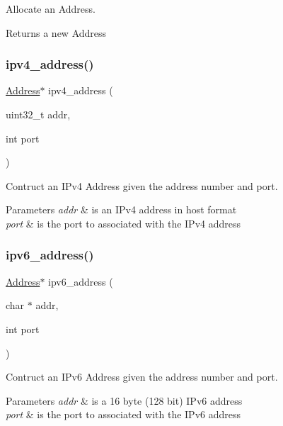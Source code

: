 Allocate an Address. 

\begin{DoxyReturn}{Returns}
a new Address 
\end{DoxyReturn}
\mbox{\label{group__address_gadcf5fd6cadba30e8c63131dee535eda9}} 
\subsubsection{\texorpdfstring{ipv4\+\_\+address()}{ipv4\_address()}}
{\footnotesize\ttfamily \hyperlink{group__address_ga80f2dcdb3778441e85ac8c9dbb6f324a}{Address}$\ast$ ipv4\+\_\+address (\begin{DoxyParamCaption}\item[{uint32\+\_\+t}]{addr,  }\item[{int}]{port }\end{DoxyParamCaption})}



Contruct an I\+Pv4 Address given the address number and port. 


\begin{DoxyParams}{Parameters}
{\em addr} & is an I\+Pv4 address in host format \\
\hline
{\em port} & is the port to associated with the I\+Pv4 address \\
\hline
\end{DoxyParams}
\mbox{\label{group__address_ga02db9250da5222ffccdd99c6f2b2d410}} 
\subsubsection{\texorpdfstring{ipv6\+\_\+address()}{ipv6\_address()}}
{\footnotesize\ttfamily \hyperlink{group__address_ga80f2dcdb3778441e85ac8c9dbb6f324a}{Address}$\ast$ ipv6\+\_\+address (\begin{DoxyParamCaption}\item[{char $\ast$}]{addr,  }\item[{int}]{port }\end{DoxyParamCaption})}



Contruct an I\+Pv6 Address given the address number and port. 


\begin{DoxyParams}{Parameters}
{\em addr} & is a 16 byte (128 bit) I\+Pv6 address \\
\hline
{\em port} & is the port to associated with the I\+Pv6 address \\
\hline
\end{DoxyParams}
